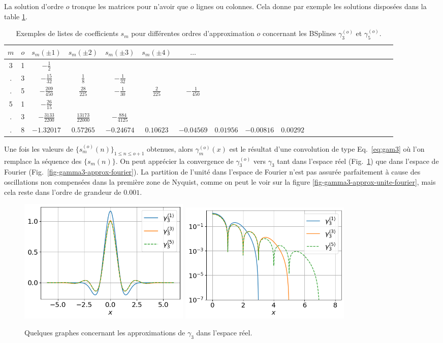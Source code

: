 \documentclass[11pt,twoside]{article}
\begin{document}
La solution d'ordre $o$ tronque les matrices pour n'avoir que $o$ lignes ou colonnes. Cela donne par exemple les solutions disposées dans la table \ref{tab-scoeff-bsplinecardapprox}.
\begin{table}
\small
\centering
\begin{tabular}{cc|*{20}{c}}
\toprule
 $m$ & $o$ & $s_m(\pm 1)$ & $s_m(\pm 2)$ & $s_m(\pm 3)$ & $s_m(\pm 4)$ & $\ldots$& \\ \midrule
   3 & 1   & $-\frac{1}{2}$ &       & \\
   . & 3   &  $-\frac{15}{32}$&$\frac{1}{8}$&$-\frac{1}{32}$&   \\
   . & 5   &  $-\frac{209}{450}$& $\frac{28}{225}$ & $-\frac{1}{30}$  & $\frac{2}{225}$&$-\frac{1}{450}$& \\ \midrule
   5 & 1   & $-\frac{26}{15}$& \\
   . & 3   & $-\frac{3133}{2200}$&$\frac{13173}{22000}$&$-\frac{884}{4125}$ & \\
   . & 8   & $-1.32017$ & $0.57265$& $-0.24674$& $0.10623$& $-0.04569$& $0.01956$& 
$-0.00816$& $0.00292$ \\
\bottomrule
\end{tabular}
\caption{Exemples de listes de coefficients $s_m$ pour différentes ordres d'approximation $o$ concernant les BSplines $\gamma^{(o)}_3$ et $\gamma^{(o)}_5$.} 
\label{tab-scoeff-bsplinecardapprox}
\end{table}
Une fois les valeurs de $\{s^{(o)}_m(n)\}_{1\leq n\leq o+1}$ obtenues, alors $\gamma_m^{(o)}(x)$ est le résultat d'une convolution de type Eq.~\ref{eq:gam3} où l'on remplace la séquence des $\{s_m(n)\}$. On peut apprécier la convergence de $\gamma^{(o)}_3$ vers $\gamma_3$ tant dans l'espace réel (Fig.~\ref{fig-gamma3-approx-real}) que dans l'espace de Fourier (Fig.~\ref{fig-gamma3-approx-fourier}). La partition de l'unité dans l'espace de Fourier n'est pas assurée parfaitement à cause des oscillations non compensées dans la première zone de Nyquist, comme on peut le voir sur la figure  \ref{fig-gamma3-approx-unite-fourier}, mais cela reste dans l'ordre de grandeur de $0.001$.
\begin{figure}
\centering
\includegraphics[width=0.4\textwidth]{fig13a.png}
\includegraphics[width=0.4\textwidth]{fig13b.png}
\caption{Quelques graphes concernant les approximations de $\gamma_3$ dans l'espace réel.}
\label{fig-gamma3-approx-real}
\end{figure}
\end{document}
